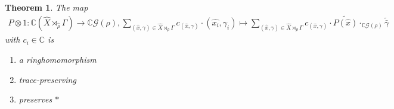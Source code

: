 \documentclass[12pt,a4paper]{scrartcl}
\newtheorem{Theorem}{Theorem}[section]
\numberwithin{equation}{section}
\newcommand{\C}{\mathbb{C}} %
\newcommand{\2}{\mathbb{Z} / 2 \mathbb{Z}}
\newcommand{\G}{\mathcal{G}}
\newcommand{\1}{\bar{1}}
\newcommand{\0}{\bar{0}}
\begin{document}
\begin{Theorem}
	The map 
	\begin{align*}
		P \otimes 1: \C(\hat{X} \rtimes_{\hat{\rho}} \Gamma) \to \C\G(\rho), 
		\sum_{(\hat{x}, \gamma) \in \hat{X} \rtimes_{\hat{\rho}} \Gamma}
		 c_{(\hat{x}, \gamma)} \cdot (\hat{x_i}, \gamma_i) \mapsto 
		 \sum_{(\hat{x}, \gamma) \in \hat{X} \rtimes_{\hat{\rho}} \Gamma} 
		 c_{(\hat{x}, \gamma)} \cdot \widetilde{P(\hat{x})} \cdot_{\C\G(\rho)} \widetilde{\bar{\gamma}} 
	\end{align*}
	 with $c_i \in \C$ is
	\begin{enumerate}
		\item a ringhomomorphism
		\item trace-preserving
		\item preserves $*$
	\end{enumerate}
\end{Theorem}
\end{document}
